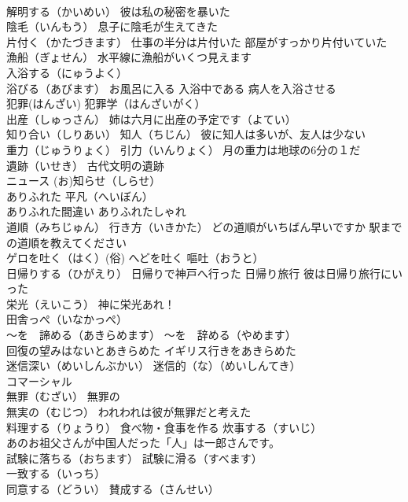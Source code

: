 \documentclass[8pt]{extreport}
\begin{document}
\begin{CJK}{UTF8}{min}
\\	解明する（かいめい） 彼は私の秘密を暴いた
\\	陰毛（いんもう） 息子に陰毛が生えてきた
\\	片付く（かたづきます） 仕事の半分は片付いた 部屋がすっかり片付いていた
\\	漁船（ぎょせん） 水平線に漁船がいくつ見えます
\\	入浴する（にゅうよく）
\\	浴びる（あびます） お風呂に入る 入浴中である 病人を入浴させる
\\	犯罪(はんざい) 犯罪学（はんざいがく）
\\	出産（しゅっさん） 姉は六月に出産の予定です（よてい）
\\	知り合い（しりあい） 知人（ちじん） 彼に知人は多いが、友人は少ない
\\	重力（じゅうりょく） 引力（いんりょく） 月の重力は地球の6分の１だ
\\	遺跡（いせき） 古代文明の遺跡
\\	ニュース (お)知らせ（しらせ）
\\	ありふれた 平凡（へいぼん）
\\	ありふれた間違い ありふれたしゃれ
\\	道順（みちじゅん） 行き方（いきかた） どの道順がいちばん早いですか 駅までの道順を教えてください
\\	ゲロを吐く（はく）(俗) へどを吐く 嘔吐（おうと）
\\	日帰りする（ひがえり） 日帰りで神戸へ行った 日帰り旅行 彼は日帰り旅行にいった
\\	栄光（えいこう） 神に栄光あれ！
\\	田舎っぺ（いなかっぺ）
\\	～を　諦める（あきらめます） ～を　辞める（やめます）
\\	回復の望みはないとあきらめた イギリス行きをあきらめた
\\	迷信深い（めいしんぶかい） 迷信的（な）（めいしんてき）
\\	コマーシャル
\\	無罪（むざい） 無罪の 
\\	無実の（むじつ） われわれは彼が無罪だと考えた
\\	料理する（りょうり） 食べ物・食事を作る 炊事する（すいじ）
\\	あのお祖父さんが中国人だった「人」は一郎さんです。
\\	試験に落ちる（おちます） 試験に滑る（すべます）
\\	一致する（いっち）　　　
\\	同意する（どうい） 賛成する（さんせい）　　

\end{CJK}
\end{document}
